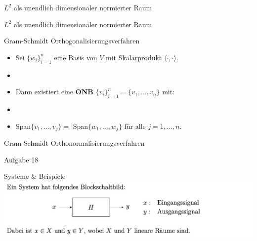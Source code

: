 \documentclass[14pt, aspectratio=169, handout]{beamer}
\begin{document}
\begin{frame}{$L^2$ als unendlich dimensionaler normierter Raum}
    
\end{frame}

\begin{frame}{$L^2$ als unendlich dimensionaler normierter Raum}
    
\end{frame}

\begin{frame}{Gram-Schmidt Orthogonalisierungsverfahren}
    \begin{itemize}
        \item Sei $\{ w_i \}_{i=1}^n $ eine Basis von $V$ mit Skalarprodukt $\langle \cdot, \cdot \rangle$.
        \item[] 
        \item[] Dann existiert eine \textbf{ONB} $\{v_i\}_{i=1}^n = \{v_1, \dots, v_n\}$ mit:
        \item[] 
        \item[] Span$\{v_1, \dots, v_j\} = $ Span$\{w_1, \dots, w_j\}$ für alle $j = 1, \dots, n$.
    \end{itemize}
\end{frame}

\begin{frame}{Gram-Schmidt Orthonormalisierungsverfahren}
\end{frame}

\begin{frame}{Aufgabe 18}
    
\end{frame}

\begin{frame}{Systeme \& Beispiele}
    \includegraphics[width=1.1\linewidth]{figures/System_Blockschaltbild.png}
\end{frame}
\end{document}
